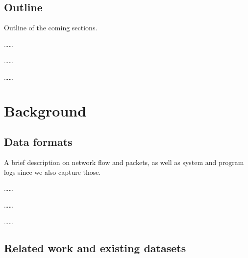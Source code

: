 \documentclass{article}
\begin{document}
\subsection{Outline}


Outline of the coming sections.

\dots \dots

\dots \dots

\dots \dots

\section{Background}\label{Sec:background}


\subsection{Data formats}

A brief description on network flow and packets, as well as system and program logs since we also capture those.

\dots \dots

\dots \dots

\dots \dots

\subsection{Related work and existing datasets}

\end{document}
